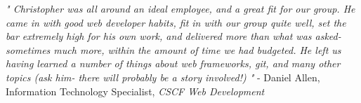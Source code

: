 \documentclass[a4paper]{article}
\newcommand{\evaluation}[4]{%
  \textcolor{lightergray}{\textit{"#1"}}%
  \newline%
  - #2, #3, \textit{#4}%
  \vspace{5pt}
}
\begin{document}
{\begin{samepage}
    \evaluation{%
      Christopher was all around an ideal employee, and a great fit for our group. He came in with good
      web developer habits, fit in with our group quite well, set the bar extremely high for his own work,
      and delivered more than what was asked- sometimes much more, within the amount of time we had budgeted.
      He left us having learned a number of things about web frameworks, git, and many other topics
      (ask him- there will probably be a story involved!)%
    }{Daniel Allen}{Information Technology Specialist}{CSCF Web Development}

  \end{samepage}
}{}
\end{document}
